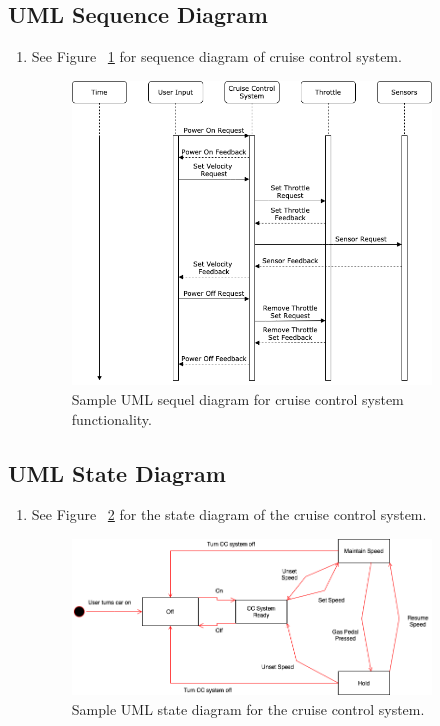 \documentclass[preprint,11pt,3p]{article}
\begin{document}
\subsection{UML Sequence Diagram}
\begin{enumerate}
	\item 	See Figure ~\ref{fig:ccUML2} for sequence diagram of cruise control system.
			\begin{figure}[H]
				\includegraphics[width=0.9\textwidth]{images/ccUML.png}
				\caption{Sample UML sequel diagram for cruise control system functionality.}
				\label{fig:ccUML2}
			\end{figure}
\end{enumerate}

\subsection{UML State Diagram}
\begin{enumerate}
	\item See Figure ~\ref{fig:stateUML} for the state diagram of the cruise control system.
			\begin{figure}[H]
				\includegraphics[width=0.9\textwidth]{images/stateUML.png}
				\caption{Sample UML state diagram for the cruise control system.}
				\label{fig:stateUML}
			\end{figure}
\end{enumerate}
\end{document}
